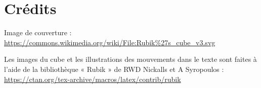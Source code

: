 \documentclass[10pt,paper=a5,pagesize]{scrbook}
\begin{document}
{\let\clearpage\relax \chapter{Crédits}}

Image de couverture : \url{https://commons.wikimedia.org/wiki/File:Rubik%27s_cube_v3.svg}

Les images du cube et les illustrations des mouvements dans le texte sont faites à l'aide
de la bibliothèque « Rubik » de RWD Nick­alls et A Sy­ropou­los : \url{https://ctan.org/tex-archive/macros/latex/contrib/rubik}
\end{document}
